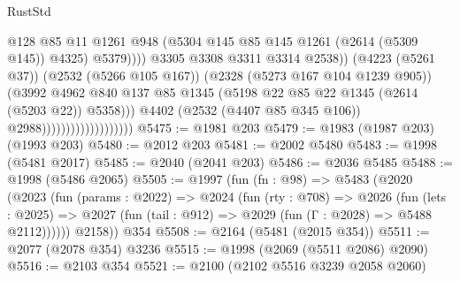 \begin{lexlean}{RustStd}
\begin{coremodule}
                                                        @128
                                                        @85
                                                        @11
                                                        @1261
                                                        @948
                                                        (@5304
                                                          @145
                                                          @85
                                                          @145
                                                          @1261
                                                          (@2614 (@5309 @145))
                                                          @4325)
                                                        @5379))))
                                                @3305
                                                @3308
                                                @3311
                                                @3314
                                                @2538))
                                            (@4223 (@5261 @37))
                                            (@2532 (@5266 @105 @167))
                                            (@2328 (@5273 @167 @104 @1239 @905))
                                            (@3992
                                              @4962
                                              @840
                                              @137
                                              @85
                                              @1345
                                              (@5198 @22 @85 @22 @1345 (@2614 (@5203 @22)) @5358)))
                                          @4402
                                          (@2532 (@4407 @85 @345 @106))
                                          @2988)))))))))))))))))))
@5475 := @1981 @203
@5479 := @1983 (@1987 @203) (@1993 @203)
@5480 := @2012 @203
@5481 := @2002 @5480
@5483 := @1998 (@5481 @2017)
@5485 := @2040 (@2041 @203)
@5486 := @2036 @5485
@5488 := @1998 (@5486 @2065)
@5505 := @1997
    (fun (fn : @98) =>
    @5483
      (@2020
        (@2023
          (fun (params : @2022) =>
          @2024
            (fun (rty : @708) =>
            @2026
              (fun (lets : @2025) =>
              @2027 (fun (tail : @912) => @2029 (fun (Γ : @2028) => @5488 @2112))))))
        @2158))
    @354
@5508 := @2164 (@5481 (@2015 @354))
@5511 := @2077 (@2078 @354) @3236
@5515 := @1998 (@2069 (@5511 @2086) @2090)
@5516 := @2103 @354
@5521 := @2100 (@2102 @5516 @3239 @2058 @2060)

\end{coremodule}
\end{lexlean}
